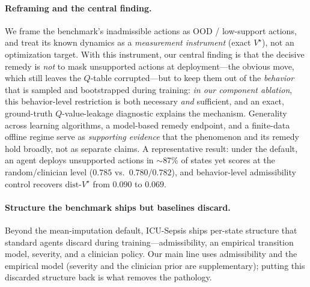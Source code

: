 \documentclass{article}
\newcommand{\dist}{\mathrm{dist}\text{-}V^\star}
\begin{document}
\paragraph{Reframing and the central finding.}
We frame the benchmark's inadmissible actions as OOD / low-support actions, and
treat its known dynamics as a \emph{measurement instrument} (exact $V^\star$),
not an optimization target. With this instrument, our central finding is that the
decisive remedy is \emph{not} to mask unsupported actions at deployment---the
obvious move, which still leaves the $Q$-table corrupted---but to keep them out of
the \emph{behavior} that is sampled and bootstrapped during training:
\emph{in our component ablation}, this behavior-level restriction is both
necessary \emph{and} sufficient, and an exact, ground-truth $Q$-value-leakage
diagnostic explains the mechanism. Generality across learning algorithms, a
model-based remedy endpoint, and a finite-data offline regime serve as
\emph{supporting evidence} that the phenomenon and its remedy hold broadly, not as
separate claims. A representative result: under the default, an agent deploys
unsupported actions in $\sim$87\% of states yet scores at the random/clinician
level ($0.785$ vs.\ $0.780/0.782$), and behavior-level admissibility control
recovers $\dist$ from $0.090$ to $0.069$.

\paragraph{Structure the benchmark ships but baselines discard.}
Beyond the mean-imputation default, ICU-Sepsis ships per-state structure that
standard agents discard during training---admissibility, an empirical transition
model, severity, and a clinician policy. Our main line uses admissibility and the
empirical model (severity and the clinician prior are supplementary); putting this
discarded structure back is what removes the pathology.
\end{document}
